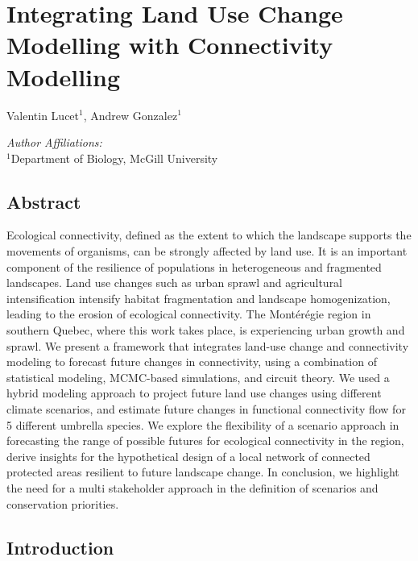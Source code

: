 \chapter{Integrating Land Use Change Modelling with Connectivity Modelling}
\begin{center}
{Valentin Lucet$^{1}$, Andrew Gonzalez$^{1}$}\\
\end{center}
\textit{Author Affiliations:}\\
\normalsize{$^{1}$Department of Biology, McGill University}\\
\section{Abstract}

Ecological connectivity, defined as the extent to which the landscape supports the movements of organisms, can be strongly affected by land use. It is an important component of the resilience of populations in heterogeneous and fragmented landscapes. Land use changes such as urban sprawl and agricultural intensification intensify habitat fragmentation and landscape homogenization, leading to the erosion of ecological connectivity. The Montérégie region in southern Quebec, where this work takes place, is experiencing urban growth and sprawl. We present a framework that integrates land-use change and connectivity modeling to forecast future changes in connectivity, using a combination of statistical modeling, MCMC-based simulations, and circuit theory. We used a hybrid modeling approach to project future land use changes using different climate scenarios, and estimate future changes in functional connectivity flow for 5 different umbrella species. We explore the flexibility of a scenario approach in forecasting the range of possible futures for ecological connectivity in the region, derive insights for the hypothetical design of a local network of connected protected areas resilient to future landscape change. In conclusion, we highlight the need for a multi stakeholder approach in the definition of scenarios and conservation priorities.\\

\section{Introduction}
\vspace{2em}

